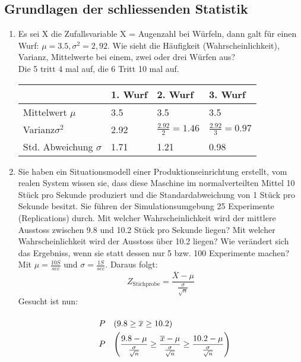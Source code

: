 \subsection{Grundlagen der schliessenden Statistik}
\begin{enumerate}
\item Es sei X die Zufallsvariable X = Augenzahl bei Würfeln, dann galt für einen Wurf: $\mu=3.5, \sigma^2=2,92$. Wie sieht die Häufigkeit (Wahrscheinlichkeit), Varianz, Mittelwerte bei einem, zwei oder drei Würfen aus?\\
Die 5 tritt 4 mal auf, die 6 Tritt 10 mal auf.
\begin{table}[ht]
\centering
\begin{tabular}{@{}llll@{}}
\toprule
 & 1. Wurf & 2. Wurf & 3. Wurf \\ \midrule
Mittelwert $\mu$ & 3.5 & 3.5 & 3.5 \\
Varianz$\sigma^2$ & 2.92 & $\frac{2.92}{2}=1.46$ & $\frac{2.92}{3}=0.97$ \\
Std. Abweichung $\sigma$ & 1.71 & 1.21 & 0.98 \\ \bottomrule
\end{tabular}
\end{table}
\item Sie haben ein Situationsmodell einer Produktionseinrichtung erstellt, vom realen System wissen sie, dass diese Maschine im normalverteilten Mittel 10 Stück pro Sekunde produziert und die Standardabweichung von 1 Stück pro Sekunde besitzt. Sie führen der Simulationsumgebung 25 Experimente (Replications) durch. 
\subitem Mit welcher Wahrscheinlichkeit wird der mittlere Ausstoss zwischen 9.8 und 10.2 Stück pro Sekunde liegen?
\subitem Mit welcher Wahrscheinlichkeit wird der Ausstoss über 10.2 liegen?
\subitem Wie verändert sich das Ergebniss, wenn sie statt dessen nur 5 bzw. 100 Experimente machen?\\
Mit $\mu = \frac{10 S}{sec}$ und $\sigma=\frac{1 S}{sec}$. Daraus folgt:
\begin{equation*}
Z_{\mbox{Stichprobe}}=\frac{\overline{X}-\mu}{\frac{\sigma}{\sqrt{n}}}
\end{equation*}
Gesucht ist nun:
\begin{equation*}
\ra{2}
\begin{array}{rcl}
&P&(9.8\geq\overline{x}\geq10.2)\\
&P&\left(\displaystyle\frac{9.8-\mu}{\frac{\sigma}{\sqrt{n}}}\geq\displaystyle\frac{\overline{x}-\mu}{\frac{\sigma}{\sqrt{n}}}\geq\displaystyle\frac{10.2-\mu}{\frac{\sigma}{\sqrt{n}}}\right)\\

\end{array}
\end{equation*}
\end{enumerate}
